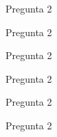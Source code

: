 \documentclass[aspectratio=169]{beamer}
\begin{document}
\begin{frame}
\begin{block}{Pregunta 2}

\end{block}
\end{frame}


\begin{frame}
\begin{block}{Pregunta 2}

\end{block}
\end{frame}



\begin{frame}
\begin{block}{Pregunta 2}

\end{block}
\end{frame}



\begin{frame}
\begin{block}{Pregunta 2}

\end{block}
\end{frame}



\begin{frame}
\begin{block}{Pregunta 2}

\end{block}
\end{frame}


\begin{frame}
\begin{block}{Pregunta 2}

\end{block}
\end{frame}
\end{document}
